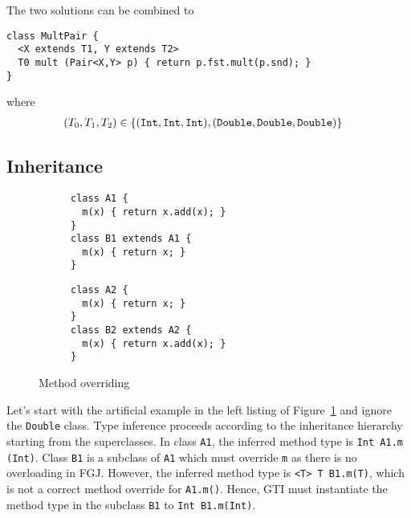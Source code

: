 
The two solutions can be combined to
\begin{lstlisting}
class MultPair {
  <X extends T1, Y extends T2>
  T0 mult (Pair<X,Y> p) { return p.fst.mult(p.snd); }
}
\end{lstlisting}
where
\begin{align*}
  (T_0, T_1, T_2) & \in \{ ({\tt Int}, {\tt Int}, {\tt Int}), ({\tt Double}, {\tt Double}, {\tt Double}) \}
\end{align*}

\subsection{Inheritance}
\label{sec:inheritance}

\begin{figure}[tp]
  \begin{subfigure}[t]{0.49\linewidth}
\begin{lstlisting}
class A1 {
  m(x) { return x.add(x); }
}
class B1 extends A1 {
  m(x) { return x; }
}
\end{lstlisting}
  \end{subfigure}
\begin{subfigure}[t]{0.49\linewidth}
\begin{lstlisting}
class A2 {
  m(x) { return x; }
}
class B2 extends A2 {
  m(x) { return x.add(x); }
}
\end{lstlisting}
  \end{subfigure}
  \caption{Method overriding}
  \label{fig:method-overriding}
\end{figure}

Let's start with the artificial example in the left
listing of Figure~\ref{fig:method-overriding} and ignore the \texttt{Double} class. Type
inference proceeds according 
to the inheritance hierarchy starting from the superclasses. In class
\texttt{A1}, the inferred method type is \texttt{Int A1.m (Int)}. Class \texttt{B1} is a
subclass of \texttt{A1} which must override \texttt{m} as there is no
overloading in FGJ. However, the inferred method 
type is \texttt{<T> T B1.m(T)}, which is not a correct
method override for \texttt{A1.m()}.
Hence, GTI must instantiate the method type in the subclass \texttt{B1} to
\texttt{Int B1.m(Int)}.

